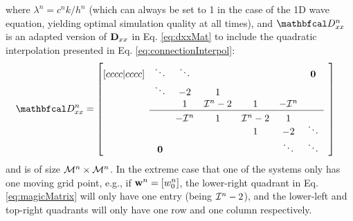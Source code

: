 \documentclass[fleqn]{jaes}
\begin{document}
where $\lambda^n = c^nk/h^n$ (which can always be set to 1 in the case of the 1D wave equation, yielding optimal simulation quality at all times), and $\DDxx$ is an adapted version of $\mathbf{D}_{xx}$ in Eq. \eqref{eq:dxxMat} to include the quadratic interpolation presented in Eq. \eqref{eq:connectionInterpol}:
\begin{equation}\label{eq:magicMatrix}
    \!\!\!\!\!\!\DDxx = \begin{bmatrix}[cccc|cccc]
     & \ddots  &\ddots & & & & \mathbf{0} & \\
       & \ddots & -2 & 1 & & & & \\
      & & 1 & \Aterm -2 & 1 & -\Aterm & \\ \cline{2-7}
      & & & & & & & \\[-0.9em]
      & & -\Aterm & 1 & \Aterm -2 & 1 & & \\[-0.5em]
         & & & &1 & -2 & \ddots  \\
         & \mathbf{0} & &  &  &\ddots & \ddots &
    \end{bmatrix}
\end{equation}
and is of size ${\mathcal{M}^n} \times {\mathcal{M}^n}$. In the extreme case that one of the systems only has one moving grid point, e.g., if $\mathbf{w}^n =[w_0^n]$, the lower-right quadrant in Eq. \eqref{eq:magicMatrix} will only have one entry (being $\mathcal{I}^n-2$), and the lower-left and top-right quadrants will only have one row and one column respectively. 
\end{document}

